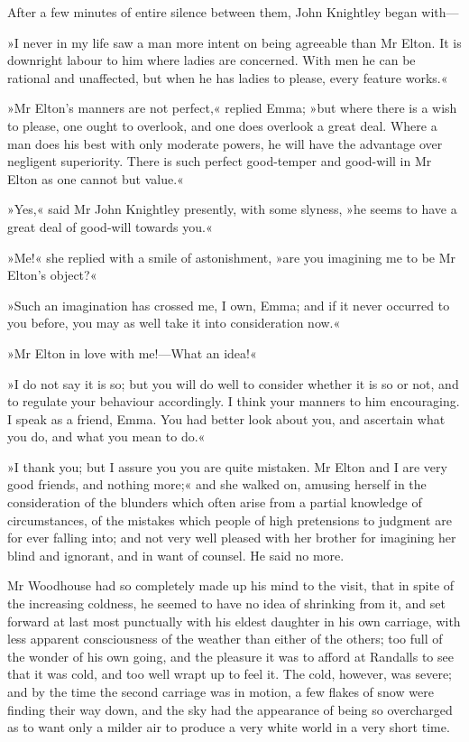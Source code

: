 After a few minutes of entire silence between them, John Knightley began with—

»I never in my life saw a man more intent on being agreeable than Mr Elton. It is downright labour to him where ladies are concerned. With men he can be rational and unaffected, but when he has ladies to please, every feature works.«

»Mr Elton's manners are not perfect,« replied Emma; »but where there is a wish to please, one ought to overlook, and one does overlook a great deal. Where a man does his best with only moderate powers, he will have the advantage over negligent superiority. There is such perfect good-temper and good-will in Mr Elton as one cannot but value.«

»Yes,« said Mr John Knightley presently, with some slyness, »he seems to have a great deal of good-will towards you.«

»Me!« she replied with a smile of astonishment, »are you imagining me to be Mr Elton's object?«

»Such an imagination has crossed me, I own, Emma; and if it never occurred to you before, you may as well take it into consideration now.«

»Mr Elton in love with me!—What an idea!«

»I do not say it is so; but you will do well to consider whether it is so or not, and to regulate your behaviour accordingly. I think your manners to him encouraging. I speak as a friend, Emma. You had better look about you, and ascertain what you do, and what you mean to do.«

»I thank you; but I assure you you are quite mistaken. Mr Elton and I are very good friends, and nothing more;« and she walked on, amusing herself in the consideration of the blunders which often arise from a partial knowledge of circumstances, of the mistakes which people of high pretensions to judgment are for ever falling into; and not very well pleased with her brother for imagining her blind and ignorant, and in want of counsel. He said no more.

Mr Woodhouse had so completely made up his mind to the visit, that in spite of the increasing coldness, he seemed to have no idea of shrinking from it, and set forward at last most punctually with his eldest daughter in his own carriage, with less apparent consciousness of the weather than either of the others; too full of the wonder of his own going, and the pleasure it was to afford at Randalls to see that it was cold, and too well wrapt up to feel it. The cold, however, was severe; and by the time the second carriage was in motion, a few flakes of snow were finding their way down, and the sky had the appearance of being so overcharged as to want only a milder air to produce a very white world in a very short time.

